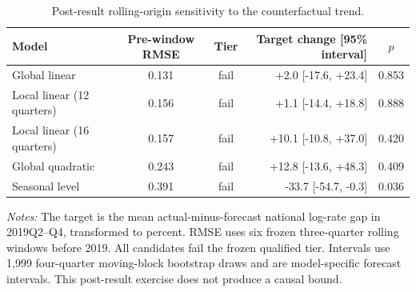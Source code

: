\begin{table}[!htbp]
\centering
\caption{Post-result rolling-origin sensitivity to the counterfactual trend.}
\label{tab:trend_sensitivity}
\begingroup\footnotesize
\begin{tabular}{@{}lccrc@{}}
\toprule
Model & Pre-window RMSE & Tier & Target change [95\% interval] & $p$ \\
\midrule
Global linear & 0.131 & fail & +2.0 [-17.6, +23.4] & 0.853 \\
Local linear (12 quarters) & 0.156 & fail & +1.1 [-14.4, +18.8] & 0.888 \\
Local linear (16 quarters) & 0.157 & fail & +10.1 [-10.8, +37.0] & 0.420 \\
Global quadratic & 0.243 & fail & +12.8 [-13.6, +48.3] & 0.409 \\
Seasonal level & 0.391 & fail & -33.7 [-54.7, -0.3] & 0.036 \\
\bottomrule
\end{tabular}
\par\smallskip
\begin{minipage}{0.96\linewidth}\footnotesize
\emph{Notes:} The target is the mean actual-minus-forecast national log-rate gap in 2019Q2--Q4, transformed to percent. RMSE uses six frozen three-quarter rolling windows before 2019. All candidates fail the frozen qualified tier. Intervals use 1,999 four-quarter moving-block bootstrap draws and are model-specific forecast intervals. This post-result exercise does not produce a causal bound.
\end{minipage}
\endgroup
\end{table}
